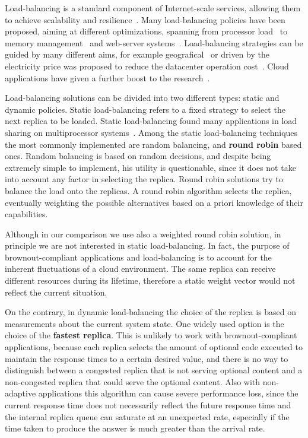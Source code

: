 Load-balancing is a standard component of Internet-scale services,
allowing them to achieve scalability and
resilience~\citep{Barroso09,Hamilton07:LISA,clusteredbalancing}.  Many
load-balancing policies have been proposed, aiming at different
optimizations, spanning from processor load~\cite{Stankovic:TC} to
memory management~\cite{PattersonMemoryLB,MemoryLBACC} and web-server
systems~\cite{Cardellini2003}. Load-balancing strategies can be guided
by many different aims, for example
geografical~\cite{GeograficalSASO,geographicalwanbalancing} or driven
by the electricity price was proposed to reduce the datacenter
operation cost~\cite{LoadBalancingForElectricity:TCC}. Cloud
applications have given a further boost to the
research~\citep{Barroso09,Lu11:PerfEval,Lin12:IGCC}.

Load-balancing solutions can be divided into two different types:
static and dynamic policies. Static load-balancing refers to a fixed
strategy to select the next replica to be loaded. Static
load-balancing found many applications in load sharing on
multiprocessor
systems~\cite{StaticLoadBalancing:TSE,StaticOptimal:ACM}. Among the
static load-balancing techniques the most commonly implemented are
random balancing, and \textbf{round robin} based ones. Random
balancing is based on random decisions, and despite being extremely
simple to implement, his utility is questionable, since it does not
take into account any factor in selecting the replica. Round robin
solutions try to balance the load onto the replicas. A round robin
algorithm selects the replica, eventually weighting the possible
alternatives based on a priori knowledge of their capabilities.

Although in our comparison we use also a weighted round robin
solution, in principle we are not interested in static
load-balancing. In fact, the purpose of brownout-compliant
applications and load-balancing is to account for the inherent
fluctuations of a cloud environment. The same replica can receive
different resources during its lifetime, therefore a static weight
vector would not reflect the current situation.

On the contrary, in dynamic load-balancing the choice of the replica
is based on measurements about the current system state. One widely
used option is the choice of the \textbf{fastest replica}. This is
unlikely to work with brownout-compliant applications, because each
replica selects the amount of optional code executed to maintain the
response times to a certain desired value, and there is no way to
distinguish between a congested replica that is not serving optional
content and a non-congested replica that could serve the optional
content. Also with non-adaptive applications this algorithm can cause
severe performance loss, since the current response time does not
necessarily reflect the future response time and the internal replica
queue can saturate at an unexpected rate, especially if the time taken
to produce the answer is much greater than the arrival rate.

